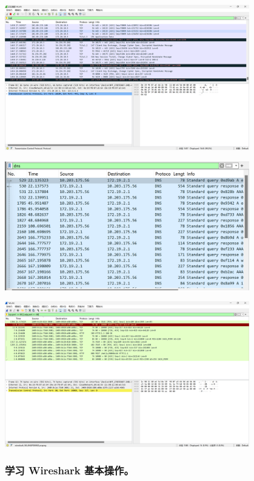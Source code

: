 \documentclass{article}
\begin{document}
\vspace{10pt}
\centerline{\includegraphics[width=0.8\textwidth]{1_1_images/5.png}}
\vspace{10pt}

\vspace{10pt}
\centerline{\includegraphics[width=0.8\textwidth]{1_1_images/6.png}}
\vspace{10pt}

\vspace{10pt}
\centerline{\includegraphics[width=0.8\textwidth]{1_1_images/7.png}}
\vspace{10pt}

\subsubsection{学习 Wireshark 基本操作。}
\end{document}
